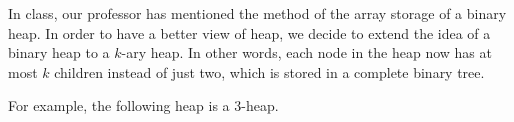 
In class, our professor has mentioned the method of the array storage of a binary heap. In order to have a better view of heap, we decide to extend the idea of a binary heap to a $k$-ary heap. In other words, each node in the heap now has at most $k$ children instead of just two, which is stored in a complete binary tree.

For example, the following heap is a 3-heap.
~\\

\begin{minipage}{1\textwidth}
	\centering
\end{minipage}%

~\\

